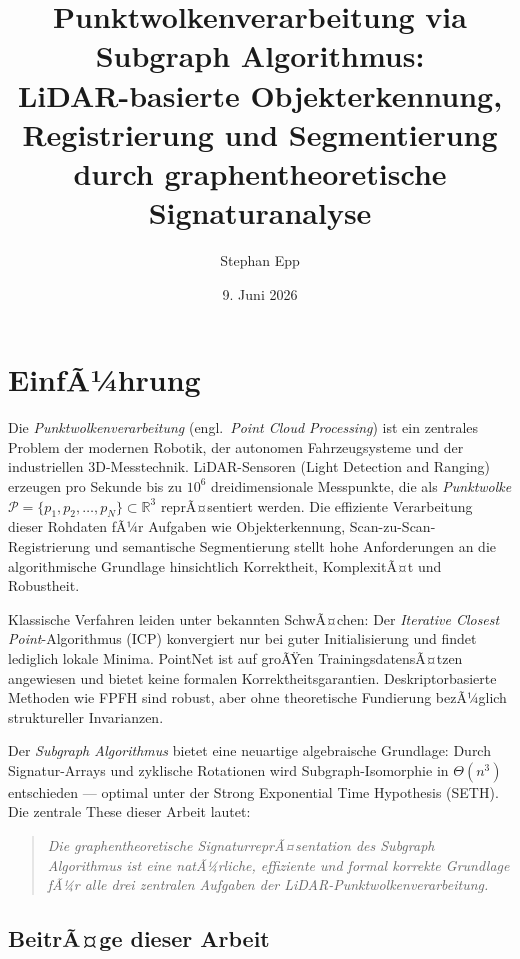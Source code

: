 ﻿\documentclass[a4paper,12pt]{article}
\title{\textbf{Punktwolkenverarbeitung via Subgraph Algorithmus:\\
LiDAR-basierte Objekterkennung, Registrierung und Segmentierung\\
durch graphentheoretische Signaturanalyse}}
\author{Stephan Epp}
\date{9. Juni 2026}
\theoremstyle{definition}
\begin{document}
\maketitle
\tableofcontents
\newpage

\section{EinfÃ¼hrung}

Die \emph{Punktwolkenverarbeitung} (engl.\ \emph{Point Cloud Processing})
ist ein zentrales Problem der modernen Robotik, der autonomen Fahrzeugsysteme
und der industriellen 3D-Messtechnik. LiDAR-Sensoren (Light Detection and
Ranging) erzeugen pro Sekunde bis zu $10^6$ dreidimensionale Messpunkte,
die als \emph{Punktwolke} $\mathcal{P} = \{p_1, p_2, \ldots, p_N\} \subset
\mathbb{R}^3$ reprÃ¤sentiert werden. Die effiziente Verarbeitung dieser
Rohdaten fÃ¼r Aufgaben wie Objekterkennung, Scan-zu-Scan-Registrierung und
semantische Segmentierung stellt hohe Anforderungen an die algorithmische
Grundlage hinsichtlich Korrektheit, KomplexitÃ¤t und Robustheit.

Klassische Verfahren leiden unter bekannten SchwÃ¤chen: Der
\emph{Iterative Closest Point}-Algorithmus (ICP) \citep{Besl1992}
konvergiert nur bei guter Initialisierung und findet lediglich lokale
Minima. PointNet \citep{Qi2017} ist auf groÃŸen TrainingsdatensÃ¤tzen
angewiesen und bietet keine formalen Korrektheitsgarantien.
Deskriptorbasierte Methoden wie FPFH \citep{Rusu2009} sind robust, aber
ohne theoretische Fundierung bezÃ¼glich struktureller Invarianzen.

Der \emph{Subgraph Algorithmus} \citep{Epp2026} bietet eine neuartige
algebraische Grundlage: Durch Signatur-Arrays und zyklische Rotationen
wird Subgraph-Isomorphie in $\Theta(n^3)$ entschieden --- optimal unter
der Strong Exponential Time Hypothesis (SETH). Die zentrale These dieser
Arbeit lautet:

\begin{quote}
  \emph{Die graphentheoretische SignaturreprÃ¤sentation des Subgraph
  Algorithmus ist eine natÃ¼rliche, effiziente und formal korrekte
  Grundlage fÃ¼r alle drei zentralen Aufgaben der
  LiDAR-Punktwolkenverarbeitung.}
\end{quote}

\subsection{BeitrÃ¤ge dieser Arbeit}
\end{document}
